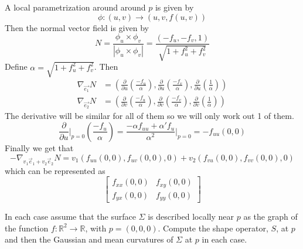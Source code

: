 \documentclass[12pt, answers]{exam}
\begin{document}
\begin{questions}
        \begin{solution}
            A local parametrization around around $p$ is given by
            \[ \phi:(u, v) \to (u, v, f(u, v)) \]
            Then the normal vector field is given by
            \[ N = \frac{\phi_u \times \phi_v}{|\phi_u \times \phi_v|} = \frac{(-f_u, -f_v, 1)}{\sqrt{1 + f_u^2 + f_v^2}} \]
            Define $\alpha = \sqrt{1 + f_u^2 + f_v^2}$. Then
            \begin{align*}
                \nabla_{\vec{e_1}}N &= \left( \frac{\partial}{\partial u} \left(\frac{-f_u}{\alpha}\right),
                \frac{\partial}{\partial u} \left(\frac{-f_v}{\alpha}\right), \frac{\partial}{\partial u} \left(\frac{1}{\alpha}\right) \right)\\
                \nabla_{\vec{e_2}}N &= \left( \frac{\partial}{\partial v} \left(\frac{-f_u}{\alpha}\right),
                \frac{\partial}{\partial v} \left(\frac{-f_v}{\alpha}\right), \frac{\partial}{\partial v} \left(\frac{1}{\alpha}\right) \right)
            \end{align*}
            The derivative will be similar for all of them so we will only work out 1 of them.
            \[ \frac{\partial}{\partial u}\bigg\rvert_{p = 0} \left( \frac{-f_u}{\alpha} \right) =
            \frac{-\alpha f_{uu} + \alpha'f_u}{\alpha^2}\bigg\rvert_{p = 0} = -f_{uu}(0, 0)\]
            Finally we get that
            \[-\nabla_{v_1\vec{e}_1 + v_2\vec{e}_2}N = v_1\left( f_{uu}(0, 0), f_{uv}(0, 0), 0 \right) +
            v_2\left( f_{vu}(0, 0), f_{vv}(0, 0), 0 \right)\]
            which can be represented as
            \[
                \begin{bmatrix}
                    f_{xx}(0, 0) & f_{xy}(0, 0) \\
                    f_{yx}(0, 0) & f_{yy}(0, 0)
                \end{bmatrix}
            \]
        \end{solution}

        \question In each case assume that the surface $\Sigma$ is described locally near $p$ as the graph of the function
        $f:\mathbb{R}^2 \rightarrow \mathbb{R}$, with $p = (0, 0, 0)$. Compute the shape operator, $S$, at $p$ and then the
        Gaussian and mean curvatures of $\Sigma$ at $p$ in each case.

\end{questions}
\end{document}
